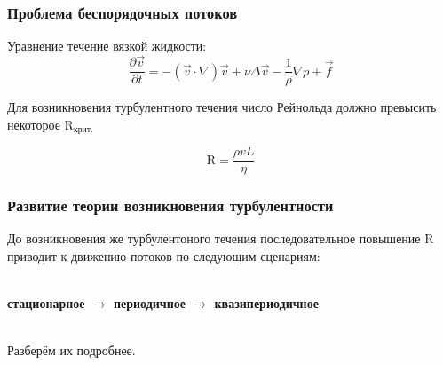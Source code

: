 

\begin{frame}
	\frametitle{Проблема беспорядочных потоков}

	Уравнение течение вязкой жидкости:
	$$
	\frac {\partial {\vec {v}}}{\partial t}=-({\vec {v}}\cdot \nabla ){\vec {v}}+\nu \Delta {\vec {v}}-{\frac {1}{\rho }}\nabla p+{\vec {f}}
	$$

	Для возникновения турбулентного течения число Рейнольда должно превысить некоторое $\text{R}_{\text{крит.}}$

	$$\text{R} = \frac{\rho v L}{\eta}$$
\end{frame}

\begin{frame}
	\frametitle{Развитие теории возникновения турбулентности}

	До возникновения же турбулентоного течения последовательное повышение $\text{R}$ приводит к движению потоков по следующим сценариям:

	\phantom{42}\\
	\textbf{стационарное $\rightarrow$ периодичное $\rightarrow$ квазипериодичное}

	\phantom{42}\\
	Разберём их подробнее.
\end{frame}